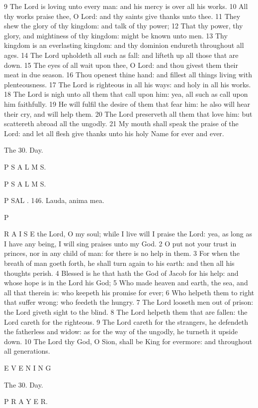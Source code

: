 9 The Lord is loving unto every man: and his mercy is over all his works. 10 All thy works praise thee, O Lord: and thy saints give thanks unto thee. 11 They shew the glory of thy kingdom: and talk of thy power; 12 That thy power, thy glory, and mightiness of thy kingdom: might be known unto men. 13 Thy kingdom is an everlasting kingdom: and thy dominion endureth throughout all ages. 14 The Lord upholdeth all such as fall: and lifteth up all those that are down. 15 The eyes of all wait upon thee, O Lord: and thou givest them their meat in due season. 16 Thou openest thine hand: and fillest all things living with plenteousness. 17 The Lord is righteous in all his ways: and holy in all his works. 18 The Lord is nigh unto all them that call upon him: yea, all such as call upon him faithfully. 19 He will fulfil the desire of them that fear him: he also will hear their cry, and will help them. 20 The Lord preserveth all them that love him: but scattereth abroad all the ungodly. 21 My mouth shall speak the praise of the Lord: and let all flesh give thanks unto his holy Name for ever and ever.

The 30. Day.

P S A L M S.

P S A L M S.

P SAL . 146. Lauda, anima mea.

P

R A I S E the Lord, O my soul; while I live will I praise the Lord: yea, as long as I have any being, I will sing praises unto my God. 2 O put not your trust in princes, nor in any child of man: for there is no help in them. 3 For when the breath of man goeth forth, he shall turn again to his earth: and then all his thoughts perish. 4 Blessed is he that hath the God of Jacob for his help: and whose hope is in the Lord his God; 5 Who made heaven and earth, the sea, and all that therein is: who keepeth his promise for ever; 6 Who helpeth them to right that suffer wrong: who feedeth the hungry. 7 The Lord looseth men out of prison: the Lord giveth sight to the blind. 8 The Lord helpeth them that are fallen: the Lord careth for the righteous. 9 The Lord careth for the strangers, he defendeth the fatherless and widow: as for the way of the ungodly, he turneth it upside down. 10 The Lord thy God, O Sion, shall be King for evermore: and throughout all generations.

E V E N I N G

The 30. Day.

P R A Y E R.

